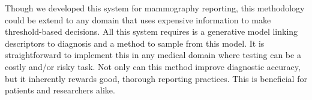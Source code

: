 Though we developed this system for mammography reporting, this methodology could be extend to any domain that uses expensive information to make threshold-based decisions. All this system requires is a generative model linking descriptors to diagnosis and a method to sample from this model. It is straightforward to implement this in any medical domain where testing can be a costly and/or risky task. Not only can this method improve diagnostic accuracy, but it inherently rewards good, thorough reporting practices. This is beneficial for patients and researchers alike.
